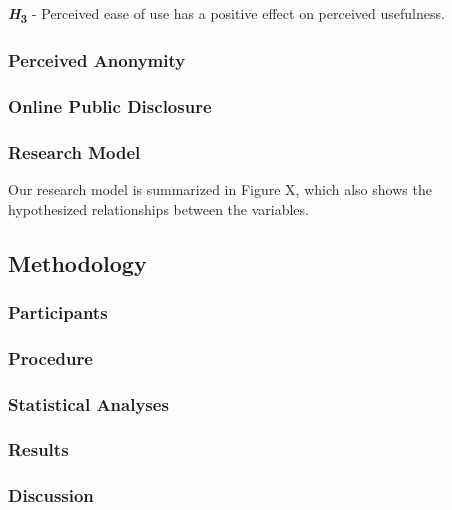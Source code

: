 \textbf{\textit{H}\textsubscript{3}} - Perceived ease of use has a positive effect on perceived
usefulness.

\subsubsection{Perceived Anonymity}


\subsubsection{Online Public Disclosure}


\subsubsection{Research Model}
Our research model is summarized in Figure X, which also shows the hypothesized relationships between the variables.

\subsection{Methodology}


\subsubsection{Participants}


\subsubsection{Procedure}


\subsubsection{Statistical Analyses}


\subsubsection{Results}


\subsubsection{Discussion}

